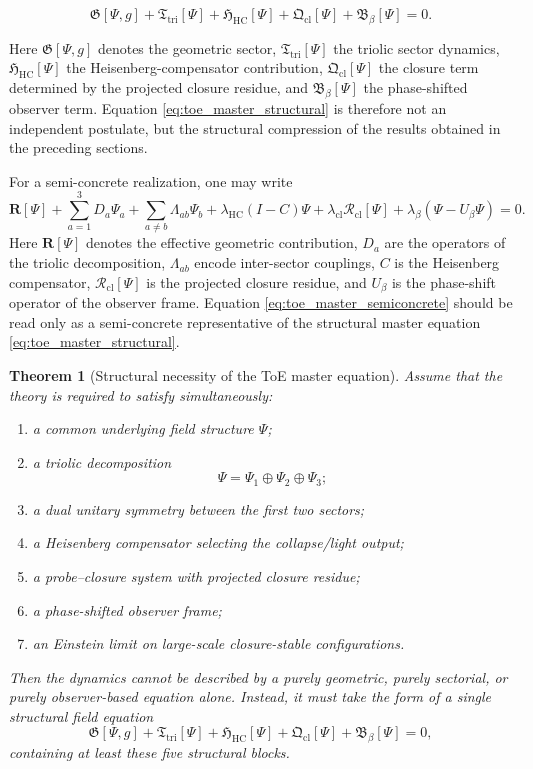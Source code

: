 \documentclass[12pt,a4paper]{article}
\newtheorem{theorem}{Theorem}[section]
\begin{document}
\begin{equation}\label{eq:toe_master_structural}
\mathfrak G[\Psi,g]
+\mathfrak T_{\mathrm{tri}}[\Psi]
+\mathfrak H_{\mathrm{HC}}[\Psi]
+\mathfrak Q_{\mathrm{cl}}[\Psi]
+\mathfrak B_{\beta}[\Psi]
=0 .
\end{equation}

Here $\mathfrak G[\Psi,g]$ denotes the geometric sector,
$\mathfrak T_{\mathrm{tri}}[\Psi]$ the triolic sector dynamics,
$\mathfrak H_{\mathrm{HC}}[\Psi]$ the Heisenberg-compensator contribution,
$\mathfrak Q_{\mathrm{cl}}[\Psi]$ the closure term determined by the projected
closure residue, and $\mathfrak B_{\beta}[\Psi]$ the phase-shifted observer
term. Equation \eqref{eq:toe_master_structural} is therefore not an
independent postulate, but the structural compression of the results obtained
in the preceding sections.

For a semi-concrete realization, one may write
\begin{equation}\label{eq:toe_master_semiconcrete}
\mathbf{R}[\Psi]
+\sum_{a=1}^{3} D_a\Psi_a
+\sum_{a\neq b}\Lambda_{ab}\Psi_b
+\lambda_{\mathrm{HC}}(I-C)\Psi
+\lambda_{\mathrm{cl}}\mathcal R_{\mathrm{cl}}[\Psi]
+\lambda_{\beta}(\Psi-U_{\beta}\Psi)
=0 .
\end{equation}
Here $\mathbf{R}[\Psi]$ denotes the effective geometric contribution,
$D_a$ are the operators of the triolic decomposition,
$\Lambda_{ab}$ encode inter-sector couplings,
$C$ is the Heisenberg compensator,
$\mathcal R_{\mathrm{cl}}[\Psi]$ is the projected closure residue,
and $U_{\beta}$ is the phase-shift operator of the observer frame.
Equation \eqref{eq:toe_master_semiconcrete} should be read only as a
semi-concrete representative of the structural master equation
\eqref{eq:toe_master_structural}.

\begin{theorem}[Structural necessity of the ToE master equation]
\label{thm:toe_master_necessity}
Assume that the theory is required to satisfy simultaneously:
\begin{enumerate}
\item a common underlying field structure $\Psi$;
\item a triolic decomposition
\[
\Psi=\Psi_1\oplus\Psi_2\oplus\Psi_3;
\]
\item a dual unitary symmetry between the first two sectors;
\item a Heisenberg compensator selecting the collapse/light output;
\item a probe--closure system with projected closure residue;
\item a phase-shifted observer frame;
\item an Einstein limit on large-scale closure-stable configurations.
\end{enumerate}
Then the dynamics cannot be described by a purely geometric, purely sectorial,
or purely observer-based equation alone. Instead, it must take the form of a
single structural field equation
\[
\mathfrak G[\Psi,g]
+\mathfrak T_{\mathrm{tri}}[\Psi]
+\mathfrak H_{\mathrm{HC}}[\Psi]
+\mathfrak Q_{\mathrm{cl}}[\Psi]
+\mathfrak B_{\beta}[\Psi]
=0,
\]
containing at least these five structural blocks.
\end{theorem}
\end{document}
